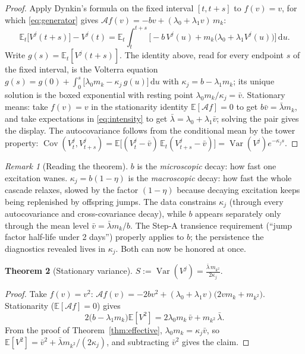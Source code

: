 \documentclass[11pt]{report}
\newtheorem{theorem}{Theorem}[chapter]
\theoremstyle{definition}
\theoremstyle{remark}
\newtheorem{remark}[theorem]{Remark}
\newcommand{\E}{\mathbb{E}}
\newcommand{\Var}{\operatorname{Var}}
\newcommand{\Cov}{\operatorname{Cov}}
\newcommand{\A}{\mathcal{A}}
\newcommand{\dd}{\,\mathrm{d}}
\newcommand{\Vj}{V^{j}}
\newcommand{\mk}{m_{k}}
\newcommand{\mkk}{m_{k^{2}}}
\begin{document}
\begin{proof}
Apply Dynkin's formula on the fixed interval $[t,t+s]$ to $f(v)=v$, for
which \eqref{eq:generator} gives
$\A f(v) = -bv+(\lambda_{0}+\lambda_{1}v)\,\mk$:
\[
\E_{t}\big[\Vj(t+s)\big]-\Vj(t)
=\E_{t}\!\int_{t}^{t+s}\!\Big[-b\,\Vj(u)+\mk\big(\lambda_{0}
+\lambda_{1}\Vj(u)\big)\Big]\dd u .
\]
Write $g(s)=\E_{t}[\Vj(t+s)]$. The identity above, read for every endpoint
$s$ of the fixed interval, is the Volterra equation
$g(s)=g(0)+\int_{0}^{s}\!\big[\lambda_{0}\mk-\kappa_{j}\,g(u)\big]\dd u$
with $\kappa_{j}=b-\lambda_{1}\mk$; its unique solution is the boxed
exponential with resting point $\lambda_{0}\mk/\kappa_{j}=\bar v$.
Stationary means: take $f(v)=v$ in the stationarity identity
$\E[\A f]=0$ to get $b\bar v=\bar\lambda\mk$, and take expectations in
\eqref{eq:intensity} to get $\bar\lambda=\lambda_{0}+\lambda_{1}\bar v$;
solving the pair gives the display. The autocovariance follows from the
conditional mean by the tower property:
$\Cov(\Vj_{t},\Vj_{t+s})
=\E\big[(\Vj_t-\bar v)\,\E_t(\Vj_{t+s}-\bar v)\big]
=\Var(\Vj)e^{-\kappa_j s}$.
\end{proof}

\begin{remark}[Reading the theorem]
$b$ is the \emph{microscopic} decay: how fast one excitation wanes.
$\kappa_{j}=b(1-\eta)$ is the \emph{macroscopic} decay: how fast the whole
cascade relaxes, slowed by the factor $(1-\eta)$ because decaying excitation
keeps being replenished by offspring jumps. The data constrains
$\kappa_{j}$ (through every autocovariance and cross-covariance decay), while
$b$ appears separately only through the mean level $\bar v=\bar\lambda\mk/b$.
The Step-A transience requirement (``jump factor half-life under 2 days'')
properly applies to $b$; the persistence the diagnostics revealed lives in
$\kappa_{j}$. Both can now be honored at once.
\end{remark}

\begin{theorem}[Stationary variance]\label{thm:varvj}
$\displaystyle
S:=\Var(\Vj)=\frac{\bar\lambda\,\mkk}{2\kappa_{j}} .$
\end{theorem}

\begin{proof}
Take $f(v)=v^{2}$: $\A f(v)=-2bv^{2}
+(\lambda_{0}+\lambda_{1}v)\big(2v\mk+\mkk\big)$. Stationarity
($\E[\A f]=0$) gives
\[
2\big(b-\lambda_{1}\mk\big)\E[V^{2}]
=2\lambda_{0}\mk\,\bar v+\mkk\,\bar\lambda .
\]
From the proof of Theorem~\ref{thm:effective},
$\lambda_{0}\mk=\kappa_{j}\bar v$, so
$\E[V^{2}]=\bar v^{2}+\bar\lambda\mkk/(2\kappa_{j})$, and subtracting
$\bar v^{2}$ gives the claim.
\end{proof}
\end{document}
